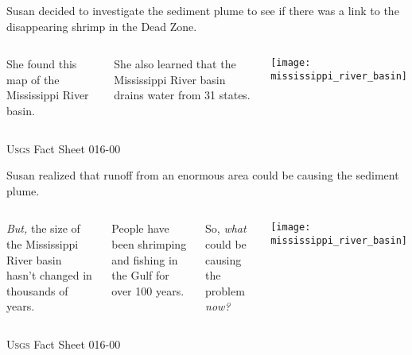 \documentclass[t]{beamer}
\begin{document}
\begin{frame}{Susan decided to investigate the sediment plume to see if there was a link to the disappearing shrimp in the Dead Zone.}

	\begin{columns}[t]
	
		
			She found this map of the Mississippi River basin.
			
			\vspace*{2\baselineskip}
			
			She also learned that the Mississippi River basin drains water from 31 states.
			
		
			\texttt{[image: mississippi\_river\_basin]}
			 
	\end{columns}
	
	\vfilll
	
	\hfill \tiny \textsc{Usgs} Fact Sheet 016-00
	
\end{frame}
%
\begin{frame}{Susan realized that runoff from an enormous area could be causing the sediment plume.}

	\begin{columns}[t]
	
		\column{0.45\textwidth}
		
			\emph{But,} the size of the Mississippi River basin hasn’t changed in thousands of years.
			
			\vspace*{1\baselineskip}
			
			People have been shrimping and fishing in the Gulf for over 100 years.
			
			\vspace*{1\baselineskip}
			
			So, \emph{what} could be causing the problem \emph{now?}
			
		\column{0.45\textwidth}
		
			\texttt{[image: mississippi\_river\_basin]}
			 
	\end{columns}
	
	\vfilll
	
	\hfill \tiny \textsc{Usgs} Fact Sheet 016-00
	
\end{frame}
%
\end{document}
